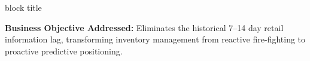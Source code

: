 \documentclass[aspectratio=169, 10pt]{beamer}
\newenvironment{highlightcard}[1][]{%
        \begin{beamercolorbox}[rounded=true,shadow=false,wd=\linewidth,sep=3.5pt,#1]{block title}%
        \fontsize{7.8pt}{9.8pt}\selectfont%
    }{%
        \end{beamercolorbox}%
    }
\begin{document}
\begin{frame}[t]
\begin{highlightcard}
            \centering\scriptsize                                                                                                                                                                      
            \textbf{Business Objective Addressed:} Eliminates the historical 7--14 day retail information lag, transforming inventory management from reactive fire-fighting to proactive predictive   
  positioning.                                                                                                                                                                                         
        \end{highlightcard}                                                                                                                                                                            
    \end{frame}                                                                                                                                                                                        
                                                                                                                                                                                                       
\end{document}
